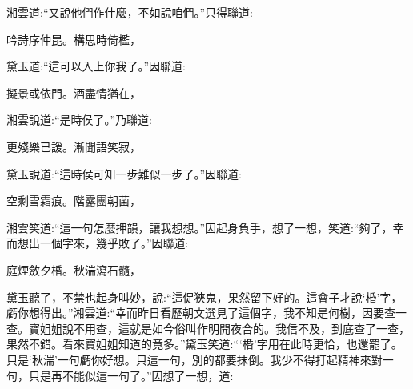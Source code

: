 \begin{parag}
    湘雲道:“又說他們作什麼，不如說咱們。”只得聯道:
\end{parag}


\begin{poem}
    \begin{pl}吟詩序仲昆。構思時倚檻，\end{pl}
\end{poem}


\begin{parag}
    黛玉道:“這可以入上你我了。”因聯道:
\end{parag}


\begin{poem}
    \begin{pl}擬景或依門。酒盡情猶在，\end{pl}
\end{poem}


\begin{parag}
    湘雲說道:“是時侯了。”乃聯道:
\end{parag}


\begin{poem}
    \begin{pl}更殘樂已諼。漸聞語笑寂，\end{pl}
\end{poem}


\begin{parag}
    黛玉說道:“這時侯可知一步難似一步了。”因聯道:
\end{parag}


\begin{poem}
    \begin{pl}空剩雪霜痕。階露團朝菌，\end{pl}
\end{poem}


\begin{parag}
    湘雲笑道:“這一句怎麼押韻，讓我想想。”因起身負手，想了一想，笑道:“夠了，幸而想出一個字來，幾乎敗了。”因聯道:
\end{parag}


\begin{poem}
    \begin{pl}庭煙斂夕棔。秋湍瀉石髓，\end{pl}
\end{poem}


\begin{parag}
    黛玉聽了，不禁也起身叫妙，說:“這促狹鬼，果然留下好的。這會子才說‘棔’字，虧你想得出。”湘雲道:“幸而昨日看歷朝文選見了這個字，我不知是何樹，因要查一查。寶姐姐說不用查，這就是如今俗叫作明開夜合的。我信不及，到底查了一查，果然不錯。看來寶姐姐知道的竟多。”黛玉笑道:“‘棔’字用在此時更恰，也還罷了。只是‘秋湍’一句虧你好想。只這一句，別的都要抹倒。我少不得打起精神來對一句，只是再不能似這一句了。”因想了一想，道:
\end{parag}


